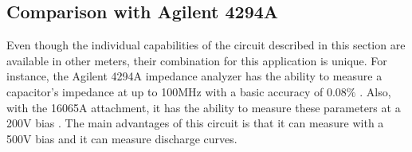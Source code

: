 \subsection{Comparison with Agilent 4294A}

Even though the individual capabilities of the circuit described in this section are available in other meters, their combination for this application is unique. For instance, the Agilent 4294A impedance analyzer has the ability to measure a capacitor's impedance at up to 100MHz with a basic accuracy of $0.08\%$ \cite{agilent_4294A}. Also, with the 16065A attachment, it has the ability to measure these parameters at a 200V bias \cite{agilent_16065A}. The main advantages of this circuit is that it can measure with a 500V bias and it can measure discharge curves.

